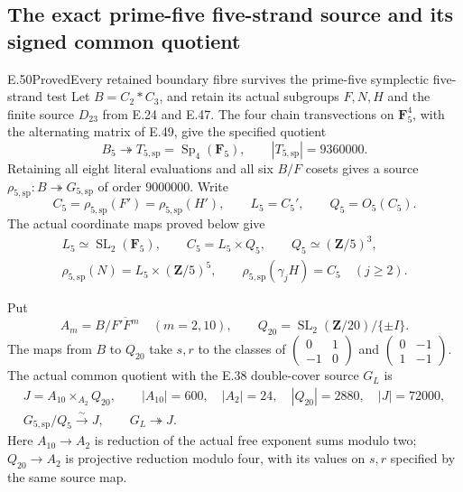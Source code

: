 \subsection{The exact prime-five five-strand source and its signed common quotient}

\begin{statement}{E.50}{Proved}{Every retained boundary fibre survives the prime-five symplectic five-strand test}
Let $B=C_2*C_3$, and retain its actual subgroups $F,N,H$
and the finite source $D_{23}$ from E.24 and E.47.
The four chain transvections on $\mathbf F_5^4$, with the
alternating matrix of E.49, give the specified quotient
\[
 B_5\twoheadrightarrow T_{5,\mathrm{sp}}
       =\operatorname{Sp}_4(\mathbf F_5),
       \qquad |T_{5,\mathrm{sp}}|=9360000.
 \tag{E.50.1}
\]
Retaining all eight literal evaluations and all six $B/F$
cosets gives a source $\rho_{5,\mathrm{sp}}:B\twoheadrightarrow
G_{5,\mathrm{sp}}$ of order $9000000$.
Write
\[
 C_5=\rho_{5,\mathrm{sp}}(F')
       =\rho_{5,\mathrm{sp}}(H'),\qquad
 L_5=C_5',\qquad Q_5=O_5(C_5).
 \tag{E.50.2}
\]
The actual coordinate maps proved below give
\[
 \begin{gathered}
 L_5\simeq\operatorname{SL}_2(\mathbf F_5),\qquad
 C_5=L_5\times Q_5,\qquad Q_5\simeq(\mathbf Z/5)^3,\\
 \rho_{5,\mathrm{sp}}(N)=L_5\times(\mathbf Z/5)^5,\qquad
 \rho_{5,\mathrm{sp}}(\gamma_jH)=C_5\quad(j\ge2).
 \end{gathered}
 \tag{E.50.3}
\]

Put
\[
 A_m=B/\overline{F'F^m}\quad(m=2,10),\qquad
 Q_{20}=\operatorname{SL}_2(\mathbf Z/20)/\{\pm I\}.
 \tag{E.50.4}
\]
The maps from $B$ to $Q_{20}$ take $s,r$ to the classes of
$\left(\begin{smallmatrix}0&1\\-1&0\end{smallmatrix}\right)$ and
$\left(\begin{smallmatrix}0&-1\\1&-1\end{smallmatrix}\right)$.
The actual common quotient with the E.38 double-cover source
$G_L$ is
\[
 \begin{gathered}
 J=A_{10}\times_{A_2}Q_{20},\qquad
 |A_{10}|=600,\quad |A_2|=24,\quad |Q_{20}|=2880,
       \quad |J|=72000,\\
 G_{5,\mathrm{sp}}/Q_5\xrightarrow{\sim}J,
       \qquad G_L\twoheadrightarrow J.
 \end{gathered}
 \tag{E.50.5}
\]
Here $A_{10}\to A_2$ is reduction of the actual free
exponent sums modulo two; $Q_{20}\to A_2$ is projective
reduction modulo four, with its values on $s,r$ specified
by the same source map.


\end{statement}
